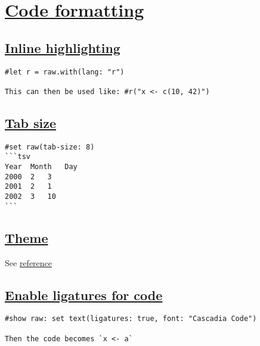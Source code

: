 \section{\texorpdfstring{\hyperref[code-formatting]{Code
formatting}}{Code formatting}}\label{code-formatting}

\subsection{\texorpdfstring{\hyperref[inline-highlighting]{Inline
highlighting}}{Inline highlighting}}\label{inline-highlighting}

\begin{verbatim}
#let r = raw.with(lang: "r")

This can then be used like: #r("x <- c(10, 42)")
\end{verbatim}

\pandocbounded{}

\subsection{\texorpdfstring{\hyperref[tab-size]{Tab
size}}{Tab size}}\label{tab-size}

\begin{verbatim}
#set raw(tab-size: 8)
```tsv
Year  Month   Day
2000  2   3
2001  2   1
2002  3   10
```
\end{verbatim}

\pandocbounded{}

\subsection{\texorpdfstring{\hyperref[theme]{Theme}}{Theme}}\label{theme}

See
\href{https://typst.app/docs/reference/text/raw/\#parameters-theme}{reference}

\subsection{\texorpdfstring{\hyperref[enable-ligatures-for-code]{Enable
ligatures for
code}}{Enable ligatures for code}}\label{enable-ligatures-for-code}

\begin{verbatim}
#show raw: set text(ligatures: true, font: "Cascadia Code")

Then the code becomes `x <- a`
\end{verbatim}

